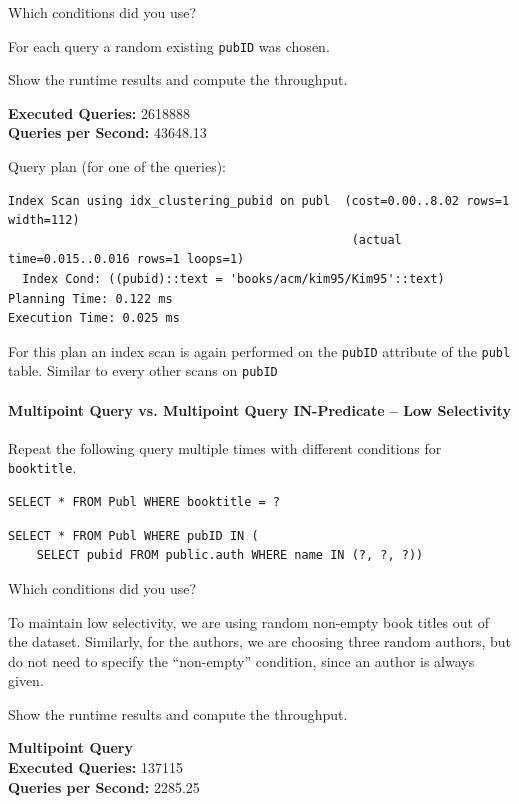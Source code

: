 \documentclass[11pt]{scrartcl}
\begin{document}
Which conditions did you use?

For each query a random existing \texttt{pubID} was chosen.

Show the runtime results and compute the throughput.

\textbf{Executed Queries: } 2618888\\
\textbf{Queries per Second: } 43648.13

Query plan (for one of the queries):

{\small
\parskip0pt\begin{verbatim}
Index Scan using idx_clustering_pubid on publ  (cost=0.00..8.02 rows=1 width=112)
                                                (actual time=0.015..0.016 rows=1 loops=1)
  Index Cond: ((pubid)::text = 'books/acm/kim95/Kim95'::text)
Planning Time: 0.122 ms
Execution Time: 0.025 ms
\end{verbatim}}

For this plan an index scan is again performed on the \texttt{pubID} attribute of the \texttt{publ} table.
Similar to every other scans on \texttt{pubID}

\paragraph{Multipoint Query vs. Multipoint Query IN-Predicate -- Low Selectivity}

Repeat the following query multiple times with different conditions for \texttt{booktitle}.

\begin{lstlisting}[style=dbtsql]
SELECT * FROM Publ WHERE booktitle = ?
\end{lstlisting}

\begin{lstlisting}[style=dbtsql]
SELECT * FROM Publ WHERE pubID IN (
    SELECT pubid FROM public.auth WHERE name IN (?, ?, ?))
\end{lstlisting}


Which conditions did you use?

To maintain low selectivity, we are using random non-empty book titles out of the dataset.
Similarly, for the authors, we are choosing three random authors, but do not need to specify the \enquote{non-empty}
condition, since an author is always given.

Show the runtime results and compute the throughput.

\textbf{Multipoint Query}\\
\textbf{Executed Queries: } 137115\\
\textbf{Queries per Second: } 2285.25 \\
\end{document}
